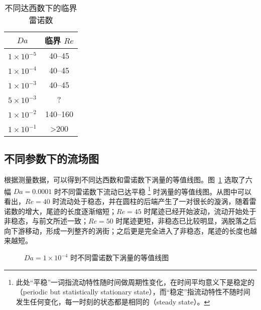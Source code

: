 \begin{table}[h]
	\caption{不同达西数下的临界雷诺数}\label{tab: critical Re}
	\vspace{.5em}\centering\wuhao
	\begin{tabular}{cc}
		\toprule[1.5pt]
		$Da$ & 临界 $Re$ \\
		\midrule[1pt]
		$1\times 10^{-5}$ & 40--45 \\
		$1\times 10^{-4}$ & 40--45 \\
		$1\times 10^{-3}$ & 40--45 \\
		$5\times 10^{-3}$ & ? \\
		$1\times 10^{-2}$ & 140--160 \\
		$1\times 10^{-1}$ & >200 \\
	\bottomrule[1.5pt]
	\end{tabular}
\end{table}

\subsection{不同参数下的流场图}

根据测量数据，可以得到不同达西数和雷诺数下涡量的等值线图。图~\ref{fig: vorticity-contour-1e-4} 选取了六幅 $Da=0.0001$ 时不同雷诺数下流动已达平稳 \footnote{此处“平稳”一词指流动特性随时间做周期性变化，在时间平均意义下是稳定的（periodic but statistically stationary state），而“稳定”指流动特性不随时间发生任何变化，每一时刻的状态都是相同的（steady state）。} 时涡量的等值线图。从图中可以看出，$Re=40$ 时流动处于稳态，并在圆柱的后端产生了一对很长的漩涡，随着雷诺数的增大，尾迹的长度逐渐缩短；$Re=45$ 时尾迹已经开始波动，流动开始处于非稳态，与前文所述一致；$Re=50$ 时尾迹更短，非稳态已比较明显，涡脱落之后向下游移动，形成一列整齐的涡街；之后更是完全进入了非稳态，尾迹的长度也越来越短。


\begin{figure}
	\centering
	\begin{minipage}{\textwidth}
		\centering
	\end{minipage}
	\centering
	\begin{minipage}{\textwidth}
		\centering
	\end{minipage}
	\centering
	\begin{minipage}{\textwidth}
		\centering
	\end{minipage}
	\caption{$Da=1\times 10^{-4}$ 时不同雷诺数下涡量的等值线图}
	\label{fig: vorticity-contour-1e-4}
\end{figure}


